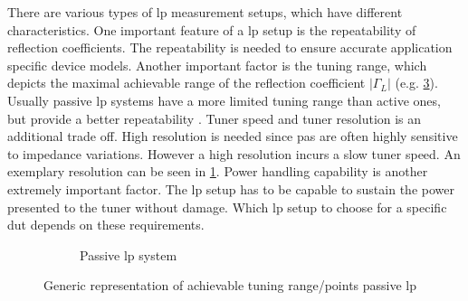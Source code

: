 \documentclass[12pt,a4paper,parskip=full,abstract=true,BCOR=12mm,twoside,open=right]{scrreprt}
\providecommand{\abs}[1]{\lvert#1\rvert}
\begin{document}
There are various types of \gls{lp} measurement setups, which have different
characteristics. One important feature of a \gls{lp} setup is the repeatability of reflection
coefficients. The repeatability is needed to ensure accurate application
specific device models. Another important factor is the tuning range, which
depicts the maximal achievable range of the reflection coefficient $\abs{\Gamma_L}$
(e.g. \cref{fig:range_passive}). Usually passive \gls{lp}
systems have a more limited tuning range than active ones, but provide a
better repeatability \cite{ghannouchi_load-pull_2013}. Tuner speed and tuner
resolution is an additional trade off. High resolution is needed since \glspl{pa} are often
highly sensitive to impedance variations. However a high resolution incurs
a slow tuner speed. An exemplary resolution can be seen in \cref{fig:generic_emt}.
Power handling capability is another extremely important factor. The \gls{lp}
setup has to be capable to sustain the power presented to the tuner without
damage. Which \gls{lp} setup to choose for a specific \gls{dut} depends on
these requirements.

\begin{figure}[htb]
    \begin{subfigure}[b]{.5\linewidth}
        \centering
        \caption{}
        \label{fig:generic_emt}
    \end{subfigure}%
    \begin{subfigure}[b]{.5\linewidth}
        \centering
        \caption{Passive \gls{lp} system}
        \label{fig:range_passive}
    \end{subfigure}
    \caption{Generic representation of achievable tuning range/points passive \gls{lp}}
\end{figure}
\end{document}

